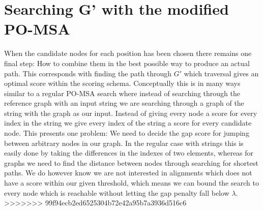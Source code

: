 \documentclass{article}
\begin{document}
\section{Searching G' with the modified PO-MSA}
When the candidate nodes for each position has been chosen there remains one final step: How to combine them in the best possible way to produce an actual path. This corresponds with finding the path through $G'$ which traversal gives an optimal score within the scoring schema. Conceptually this is in many ways similar to a regular PO-MSA search where instead of searching through the reference graph with an input string we are searching through a graph of the string with the graph as our input. Instead of giving every node a score for every index in the string we give every index of the string a score for every candidate node. This presents one problem: We need to decide the gap score for jumping between arbitrary nodes in our graph. In the regular case with strings this is easily done by taking the differences in the indexes of two elements, whereas for graphs we need to find the distance between nodes through searching for shortest paths. We do however know we are not interested in alignments which does not have a score within our given threshold, which means we can bound the search to every node which is reachable without letting the gap penalty fall below $\lambda$.\\
>>>>>>> 99f94ecb2ed6525304b72e42a95b7a3936d516c6
\par\noindent
\end{document}
